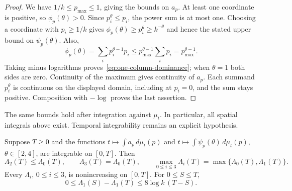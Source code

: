 \begin{proof}
We have $1/k\le p_{\max}\le1$, giving the bounds on $a_p$.
At least one coordinate is positive, so $\phi_p(\theta)>0$.
Since $p_i^\theta\le p_i$, the power sum is at most one. Choosing a
coordinate with $p_i\ge1/k$ gives
$\phi_p(\theta)\ge p_i^\theta\ge k^{-\theta}$ and hence the stated
upper bound on $\psi_p(\theta)$. Also,
\[
 \phi_p(\theta)=\sum_i p_i^{\theta-1}p_i
 \le p_{\max}^{\theta-1}\sum_i p_i=p_{\max}^{\theta-1}.
\]
Taking minus logarithms proves~\eqref{eq:one-column-dominance}; when
$\theta=1$ both sides are zero. Continuity of the maximum gives
continuity of $a_p$. Each summand $p_i^\theta$ is continuous on the
displayed domain, including at $p_i=0$, and the sum stays positive.
Composition with $-\log$ proves the last assertion.
\end{proof}

The same bounds hold after integration against $\mu_t$. In particular,
all spatial integrals above exist. Temporal integrability remains an
explicit hypothesis.

\begin{lemma}
\label{lem:margin-dominance}
Suppose $T\ge0$ and the functions
$t\mapsto\int a_p\,d\mu_t(p)$ and
$t\mapsto\int\psi_p(\theta)\,d\mu_t(p)$, $\theta\in[2,4]$, are
integrable on $[0,T]$. Then
\begin{equation}\label{eq:dominance-reduction}
 \Lambda_2(T)\le\Lambda_0(T),\qquad
 \Lambda_3(T)=\Lambda_0(T),\qquad
 \max_{0\le i\le3}\Lambda_i(T)=\max\{\Lambda_0(T),\Lambda_1(T)\}.
\end{equation}
Every $\Lambda_i$, $0\le i\le3$, is nonincreasing on $[0,T]$.
For $0\le S\le T$,
\begin{equation}\label{eq:lambda-horizon}
 0\le\Lambda_1(S)-\Lambda_1(T)\le8\log k\,(T-S).
\end{equation}
\end{lemma}

